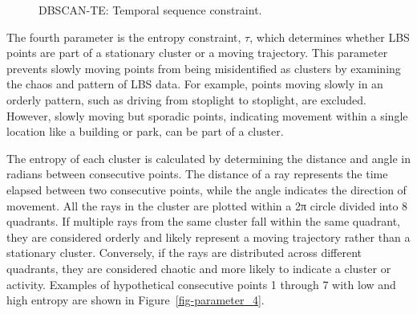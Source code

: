 \documentclass[
  letterpaper,
  number,
  review,
  3p]{elsarticle}
\begin{document}
\begin{figure}[H]


\caption{\label{fig-parameter_3}DBSCAN-TE: Temporal sequence
constraint.}

\end{figure}%

The fourth parameter is the entropy constraint, \(\tau\), which
determines whether LBS points are part of a stationary cluster or a
moving trajectory. This parameter prevents slowly moving points from
being misidentified as clusters by examining the chaos and pattern of
LBS data. For example, points moving slowly in an orderly pattern, such
as driving from stoplight to stoplight, are excluded. However, slowly
moving but sporadic points, indicating movement within a single location
like a building or park, can be part of a cluster.

The entropy of each cluster is calculated by determining the distance
and angle in radians between consecutive points. The distance of a ray
represents the time elapsed between two consecutive points, while the
angle indicates the direction of movement. All the rays in the cluster
are plotted within a 2π circle divided into 8 quadrants. If multiple
rays from the same cluster fall within the same quadrant, they are
considered orderly and likely represent a moving trajectory rather than
a stationary cluster. Conversely, if the rays are distributed across
different quadrants, they are considered chaotic and more likely to
indicate a cluster or activity. Examples of hypothetical consecutive
points 1 through 7 with low and high entropy are shown in
Figure~\ref{fig-parameter_4}.
\end{document}
